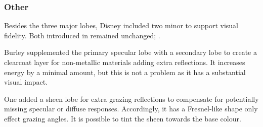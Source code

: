 \subsubsection*{Other}

Besides the three major lobes, Disney included two minor to support visual fidelity.
Both introduced in \cite{burley_physically_2012} remained unchanged; \cite{burley_extending_2015}.

Burley supplemented the primary specular lobe with a secondary lobe to create a clearcoat layer for non-metallic materials adding extra reflections.
It increases energy by a minimal amount, but this is not a problem as it has a substantial visual impact.

One added a sheen lobe for extra grazing reflections to compensate for potentially missing specular or diffuse responses.
Accordingly, it has a Fresnel-like shape only effect grazing angles.
It is possible to tint the sheen towards the base colour.

